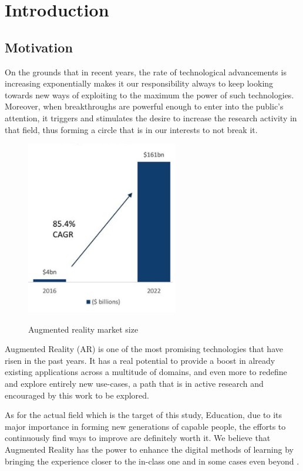 \documentclass[12 pct]{report}
\begin{document}
\listoffigures

\listoftables

\chapter{Introduction}

\section{Motivation}
On the grounds that in recent years, the rate of technological advancements is increasing exponentially makes it our responsibility always to keep looking towards new ways of exploiting to the maximum the power of such technologies. 
Moreover, when breakthroughs are powerful enough to enter into the public's attention, it triggers and stimulates the desire to increase the research activity in that field, thus forming a circle that is in our interests to not break it.

\begin{figure}[H]
\includegraphics[width=0.59\textwidth]{ar-chart}
\centering
\label{fig:feature-points}
\caption{Augmented reality market size \cite{consultancy.uk}}
\end{figure}

Augmented Reality (AR) \cite{azuma2001recent} is one of the most promising technologies that have risen in the past years. 
It has a real potential to provide a boost in already existing applications across a multitude of domains, and even more to redefine and explore entirely new use-cases, a path that is in active research and encouraged by this work to be explored.

As for the actual field which is the target of this study, Education, due to its major importance in forming new generations of capable people, the efforts to continuously find ways to improve are definitely worth it. 
We believe that Augmented Reality has the power to enhance the digital methods of learning by bringing the experience closer to the in-class one and in some cases even beyond \cite{wu2013current}.
\end{document}
